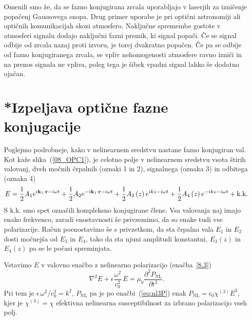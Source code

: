 \begin{remark}
Omenili smo že, da se fazno konjugirana zrcala uporabljajo v laserjih za izničenje
popačenj Gaussovega snopa. Drug primer uporabe je pri optični astronomiji
ali optičnih komunikacijah skozi atmosfero. Naključne spremembe gostote v atmosferi
signalu dodajo naključni fazni premik, ki signal popači. Če se signal odbije od zrcala nazaj
proti izvoru, je torej dvakratno popačen. Če pa se odbije od fazno konjugiranega zrcala, 
se vpliv nehomogenosti atmosfere ravno izniči in na prenos signala ne vpliva, poleg
tega je šibek vpadni signal lahko še dodatno ojačan. 
\end{remark}

\section{*Izpeljava optične fazne konjugacije}
Poglejmo podrobneje, kako v nelinearnem sredstvu nastane fazno konjugiran
val. Kot kaže slika~(\ref{08_OPC1}), je celotno polje v nelinearnem
sredstvu vsota štirih valovanj, dveh močnih črpalnih (oznaki 1 in 2), signalnega 
(oznaka 3) in odbitega (oznaka 4)
\begin{equation}
E=\frac{1}{2}A_{1}e^{i{\bf k}_{1}\cdot{\bf r}-i\omega t}+\frac{1}{2}A_{2}e^{-i{\bf k}_{1}\cdot{\bf r}-
i\omega t}+\frac{1}{2}A_{3}\left(z\right)e^{ikz-i\omega t}+\frac{1}{2}A_{4}
\left(z\right)e^{-ikz-i\omega t}+{\rm k.k.}
\label{8.99}
\end{equation}
S k.k. smo spet označili kompleksno konjugirane člene.  Vsa valovanja naj imajo
enako frekvenco, zaradi enostavnosti še privzemimo, da so enake tudi vse polarizacije.
Račun poenostavimo še s privzetkom, da sta črpalna vala $E_{1}$
in $E_{2}$ dosti močnejša od $E_{3}$ in $E_{4}$, tako da sta njuni
amplitudi konstantni, $E_{3}\left(z\right)$ in $E_{4}\left(z\right)$
pa se le počasi spreminjata.

Vstavimo $E$ v valovno enačbo z nelinearno polarizacijo (enačba~\ref{8.3})
\begin{equation}
\nabla^{2}E+\epsilon\frac{\omega^{2}}{c_0^{2}}\, 
E=\mu_{0}\frac{\partial^2 P_{\mathrm{NL}}}{\partial t^2}.
\label{8.100}
\end{equation}
Pri tem je $\epsilon\,\omega^{2}/c_0^{2}=k^{2}$, $P_{\textrm{NL}}$ pa je po enačbi~(\ref{eq:nl3P})
enak $P_\mathrm{NL}= \epsilon_{0}\chi^{(3)}E^3$, kjer je $\chi^{(3)} = \chi$
efektivna nelinearna susceptibilnost
za izbrano polarizacijo vseh polj. 

